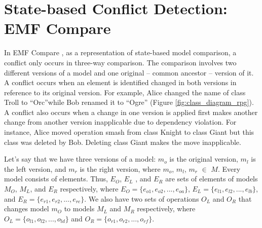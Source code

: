 \section{State-based Conflict Detection: EMF Compare}
\label{sec:state_based_conflict_detection_emf_compare}
In EMF Compare \cite{emfcompare2018developer}, as a representation of state-based model comparison, a conflict only occurs in three-way comparison. The comparison involves two different versions of a model and one original -- common ancestor -- version of it. A conflict occurs when an element is identified changed in both versions in reference to its original version. For example, Alice changed the \textsf{name} of class \textsf{Troll} to ``Orc''while Bob renamed it to ``Ogre'' (Figure \ref{fig:class_diagram_rpg}). A conflict also occurs when a change in one version is applied first makes another change from another version inapplicable due to dependency violation. For instance, Alice moved operation \textsf{smash} from class \textsf{Knight} to class \textsf{Giant} but this class was deleted by Bob. Deleting class \textsf{Giant} makes the move inapplicable.

Let's say that we have three versions of a model: $m_{o}$ is the original version, $m_{l}$ is the left version, and $m_{r}$ is the right version, where $m_{o}$, $m_{l}$, $m_{r}$ $\in$ $M$. 
Every model consists of elements. Thus, $E_{O}$, $E_{L}$ , and $E_{R}$ are sets of elements of models $M_{O}$, $M_{L}$, and $E_{R}$ respectively, where $E_{O}=\{e_{o1}, e_{o2}, ..., e_{oa}\}$, $E_{L}=\{e_{l1}, e_{l2}, ..., e_{lb}\}$, and $E_{R}=\{e_{r1}, e_{r2}, ..., e_{rc}\}$. 
We also have two sets of operations $O_{L}$ and $O_{R}$ that changes model $m_{O}$ to models $M_{L}$ and $M_{R}$ respectively, where $O_{L}=\{o_{l1}, o_{l2}, ..., o_{ld}\}$ and $O_{R}=\{o_{r1}, o_{r2}, ..., o_{rf}\}$. 

